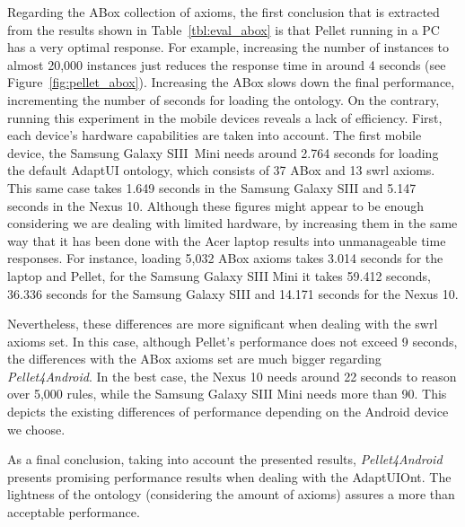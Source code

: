 Regarding the ABox collection of axioms, the first conclusion that is extracted
from the results shown in Table~\ref{tbl:eval_abox} is that Pellet running in a 
PC has a very optimal response. For example, increasing the number of instances 
to almost 20,000 instances just reduces the response time in around 4 seconds 
(see Figure~\ref{fig:pellet_abox}). Increasing the ABox slows down the final 
performance, incrementing the number of seconds for loading the ontology. On 
the contrary, running this experiment in the mobile devices reveals a lack of 
efficiency. First, each device's hardware capabilities are taken into account. 
The first mobile device, the Samsung Galaxy SIII~Mini needs around 2.764 
seconds for loading the default AdaptUI ontology, which consists of 37 ABox and 
13 \ac{swrl} axioms. This same case takes 1.649 seconds in the Samsung Galaxy 
SIII and 5.147 seconds in the Nexus 10. Although these figures might appear to 
be enough considering we are dealing with limited hardware, by increasing them 
in the same way that it has been done with the Acer laptop results into unmanageable
time responses. For instance, loading 5,032 ABox axioms takes 3.014 seconds for
the laptop and Pellet, for the Samsung Galaxy SIII Mini it takes 59.412 seconds,
36.336 seconds for the Samsung Galaxy SIII and 14.171 seconds for the Nexus 10. 

Nevertheless, these differences are more significant when dealing with the \ac{swrl}
axioms set. In this case, although Pellet's performance does not exceed 9 
seconds, the differences with the ABox axioms set are much bigger regarding
\textit{Pellet4Android}. In the best case, the Nexus 10 needs around 22 seconds
to reason over 5,000 rules, while the Samsung Galaxy SIII Mini needs more 
than 90. This depicts the existing differences of performance depending on the
Android device we choose.

As a final conclusion, taking into account the presented results, \textit{Pellet4Android}
presents promising performance results when dealing with the AdaptUIOnt. The
lightness of the ontology (considering the amount of axioms) assures a more
than acceptable performance.